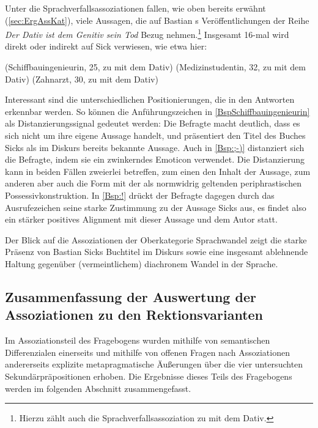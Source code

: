Unter die Sprachverfallsassoziationen fallen, wie oben bereits erwähnt (\autoref{sec:ErgAssKat}), viele Aussagen, die auf Bastian \citeauthor{Sick2006}s Veröffentlichungen der Reihe \textit{Der Dativ ist dem Genitiv sein Tod} Bezug nehmen.\footnote{Hierzu zählt auch die Sprachverfallsassoziation zu \gegenueber{} mit dem Dativ.}
Insgesamt 16-mal wird direkt oder indirekt auf Sick verwiesen, wie etwa hier:
\begin{exe}
\ex {} (Schiffbauingenieurin, 25, zu \wegen{} mit dem Dativ)\label{BspSchiffbauingenieurin}
\ex {} (Medizinstudentin, 32, zu \waehrend{} mit dem Dativ) \label{Bsp:;-)}
\ex {} (Zahnarzt, 30, zu \wegen{} mit dem Dativ) \label{Bsp:!}
\end{exe}
Interessant sind die unterschiedlichen Positionierungen, die in den Antworten erkennbar werden. 
So können die Anführungszeichen in \autoref{BspSchiffbauingenieurin} als Distanzierungssignal gedeutet werden: Die Befragte macht deutlich, dass es sich nicht um ihre eigene Aussage handelt, und präsentiert den Titel des Buches Sicks als im Diskurs bereits bekannte Aussage. 
Auch in \autoref{Bsp:;-)} distanziert sich die Befragte, indem sie ein zwinkerndes Emoticon verwendet. 
Die Distanzierung kann in beiden Fällen zweierlei betreffen, zum einen den Inhalt der Aussage, zum anderen aber auch die Form mit der als normwidrig geltenden periphrastischen Possessivkonstruktion. 
In \autoref{Bsp:!} drückt der Befragte dagegen durch das Ausrufezeichen seine starke Zustimmung zu der Aussage Sicks aus, es findet also ein stärker positives Alignment mit dieser Aussage und dem Autor statt.

Der Blick auf die Assoziationen der Oberkategorie \glqq Sprachwandel\grqq{} zeigt die starke Präsenz von Bastian Sicks Buchtitel im Diskurs sowie eine insgesamt ablehnende Haltung gegenüber (vermeintlichem) diachronem Wandel in der Sprache. 
\subsection{Zusammenfassung der Auswertung der Assoziationen zu den Rektionsvarianten} 
\label{sec:ZsfsgAss}
Im Assoziationsteil des Fragebogens wurden mithilfe von semantischen Differenzialen einerseits und mithilfe von offenen Fragen nach Assoziationen andererseits explizite metapragmatische Äußerungen über die vier untersuchten Sekundärpräpositionen erhoben. 
Die Ergebnisse dieses Teils des Fragebogens werden im folgenden Abschnitt zusammengefasst. 

